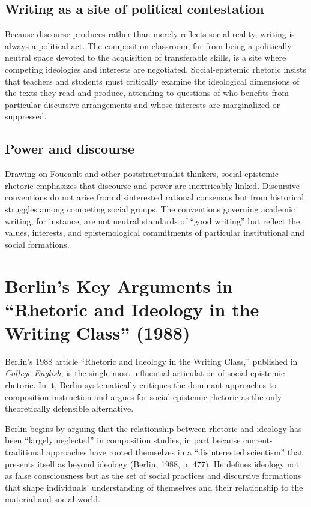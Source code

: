\documentclass[12pt]{article}
\begin{document}
\subsection*{Writing as a site of political contestation}

Because discourse produces rather than merely reflects social reality, writing is always a political act. The composition classroom, far from being a politically neutral space devoted to the acquisition of transferable skills, is a site where competing ideologies and interests are negotiated. Social-epistemic rhetoric insists that teachers and students must critically examine the ideological dimensions of the texts they read and produce, attending to questions of who benefits from particular discursive arrangements and whose interests are marginalized or suppressed.

\subsection*{Power and discourse}

Drawing on Foucault and other poststructuralist thinkers, social-epistemic rhetoric emphasizes that discourse and power are inextricably linked. Discursive conventions do not arise from disinterested rational consensus but from historical struggles among competing social groups. The conventions governing academic writing, for instance, are not neutral standards of ``good writing'' but reflect the values, interests, and epistemological commitments of particular institutional and social formations.

\section{Berlin's Key Arguments in ``Rhetoric and Ideology in the Writing Class'' (1988)}

Berlin's 1988 article ``Rhetoric and Ideology in the Writing Class,'' published in \textit{College English}, is the single most influential articulation of social-epistemic rhetoric. In it, Berlin systematically critiques the dominant approaches to composition instruction and argues for social-epistemic rhetoric as the only theoretically defensible alternative.

Berlin begins by arguing that the relationship between rhetoric and ideology has been ``largely neglected'' in composition studies, in part because current-traditional approaches have rooted themselves in a ``disinterested scientism'' that presents itself as beyond ideology (Berlin, 1988, p. 477). He defines ideology not as false consciousness but as the set of social practices and discursive formations that shape individuals' understanding of themselves and their relationship to the material and social world.
\end{document}
